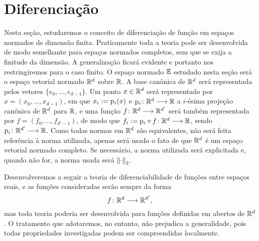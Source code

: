 


\section{Diferenciação}

Nesta seção, estudaremos o conceito de diferenciação de função em espaços normados de dimensão finita. Praticamente toda a teoria pode ser desenvolvida de modo semelhante para espaços normados completos, sem que se exija a finitude da dimensão. A generalização ficará evidente e portanto nos restringiremos para o caso finito. O espaço normado $\mathbb{E}$ estudado nesta seção será o espaço vetorial normado $\mathbb{R}^d$ sobre $\mathbb{R}$. A base canônica de $\mathbb{R}^d$ será representada pelos vetores $\{e_0, \ldots, e_{d-1}\}$. Um ponto $x \in \mathbb{R}^d$ será representado por $x=(x_0,\ldots,x_{d-1})$, em que $x_i := \mathrm{p}_i(x)$ e ${\mathrm{p}_i}\colon {\mathbb{R}^d} \longrightarrow {\mathbb{R}}$ a $i$-ésima projeção canônica de $\mathbb{R}^d$ para $\mathbb{R}$, e uma função ${f}\colon {\mathbb{R}^d} \longrightarrow {\mathbb{R}^{d'}}$ será também representada por $f=(f_0,\ldots,f_{d'-1})$, de modo que $f_i := {\mathrm{p}_i \circ f}\colon {\mathbb{R}^d} \longrightarrow {\mathbb{R}}$, sendo ${\mathrm{p}_i}\colon {\mathbb{R}^{d'}} \longrightarrow {\mathbb{R}}$. Como todas normas em $\mathbb{R}^d$ são equivalentes, não será feita referência à norma utilizada, apenas será usado o fato de que $\mathbb{R}^d$ é um espaço vetorial normado completo. Se necessário, a norma utilizada será explicitada e, quando não for, a norma usada será $\left\Vert{\cdot}\right\Vert_2$.

Desenvolveremos a seguir a teoria de diferenciabilidade de funções entre espaços reais, e as funções consideradas serão sempre da forma
	\begin{equation*}
	{f}\colon {\mathbb{R}^d} \longrightarrow {\mathbb{R}^{d'}},
	\end{equation*}
mas toda teoria poderia ser desenvolvida para funções definidas em abertos de $\mathbb{R}^d$. O tratamento que adotaremos, no entanto, não prejudica a generalidade, pois todas propriedades investigadas podem ser compreendidas localmente.


